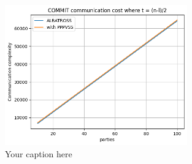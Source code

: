 \begin{figure}[htbp]
  \centering
  \includegraphics[width=0.7\textwidth]{figures/commit_comm.png}
  \caption{Your caption here}
  \label{fig:dealer_commit_comm}
\end{figure}